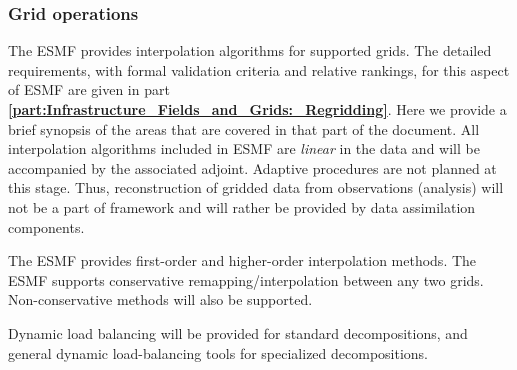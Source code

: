 \subsubsection{Grid operations}

The ESMF provides interpolation algorithms for supported grids.  
The detailed requirements, with formal validation criteria
and relative rankings, for this aspect of ESMF are given
in part {\bf \ref{part:Infrastructure_Fields_and_Grids:_Regridding}}.
Here we provide a brief synopsis of the areas that are covered
in that part of the document.
All interpolation algorithms included in ESMF are {\it linear} in the data
and will be accompanied by the associated adjoint.  Adaptive
procedures are not planned at this stage. Thus, reconstruction of
gridded data from observations (analysis) will not be a part of
framework and will rather be provided by data assimilation components.

The ESMF provides first-order and higher-order interpolation 
methods.  The ESMF supports conservative remapping/interpolation 
between any two grids. Non-conservative methods will also 
be supported.

Dynamic load balancing will be provided for standard decompositions, 
and general dynamic load-balancing tools for specialized decompositions.


